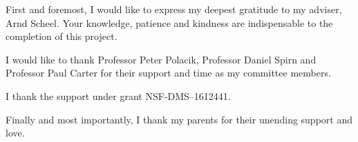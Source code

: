 
First and foremost, I would like to express my deepest gratitude to my adviser, Arnd Scheel. Your knowledge, patience and kindness are indispensable to the completion of this project.


I would like to thank Professor Peter Polacik, Professor
Daniel Spirn and Professor Paul Carter for their support and time as my committee
members.


I thank the support under grant NSF-DMS--1612441.

Finally and most importantly, I thank my parents for their unending support and love.